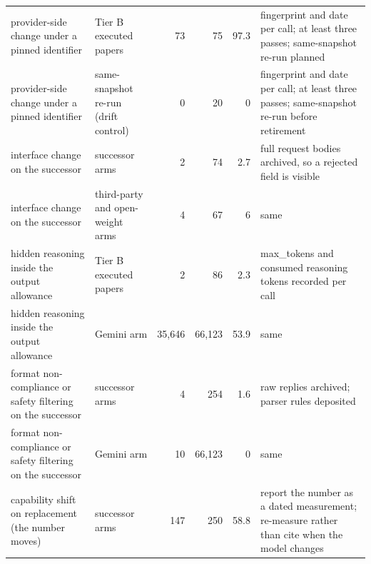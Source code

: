 \begin{longtable}{>{\raggedright\arraybackslash}p{30mm}>{\raggedright\arraybackslash}p{24mm}rrr>{\raggedright\arraybackslash}p{34mm}}
9 provider-\allowbreak{}side change under a pinned identifier & Tier B executed papers & 73 & 75 & 97.3 & fingerprint and date per call; at least three passes; same-\allowbreak{}snapshot re-\allowbreak{}run planned \\
9 provider-\allowbreak{}side change under a pinned identifier & same-\allowbreak{}snapshot re-\allowbreak{}run (drift control) & 0 & 20 & 0 & fingerprint and date per call; at least three passes; same-\allowbreak{}snapshot re-\allowbreak{}run before retirement \\
10 interface change on the successor & successor arms & 2 & 74 & 2.7 & full request bodies archived, so a rejected field is visible \\
10 interface change on the successor & third-\allowbreak{}party and open-\allowbreak{}weight arms & 4 & 67 & 6 & same \\
11 hidden reasoning inside the output allowance & Tier B executed papers & 2 & 86 & 2.3 & max\_\allowbreak{}tokens and consumed reasoning tokens recorded per call \\
11 hidden reasoning inside the output allowance & Gemini arm & 35,646 & 66,123 & 53.9 & same \\
12 format non-\allowbreak{}compliance or safety filtering on the successor & successor arms & 4 & 254 & 1.6 & raw replies archived; parser rules deposited \\
12 format non-\allowbreak{}compliance or safety filtering on the successor & Gemini arm & 10 & 66,123 & 0 & same \\
13 capability shift on replacement (the number moves) & successor arms & 147 & 250 & 58.8 & report the number as a dated measurement; re-\allowbreak{}measure rather than cite when the model changes \\
\end{longtable}
\endgroup

